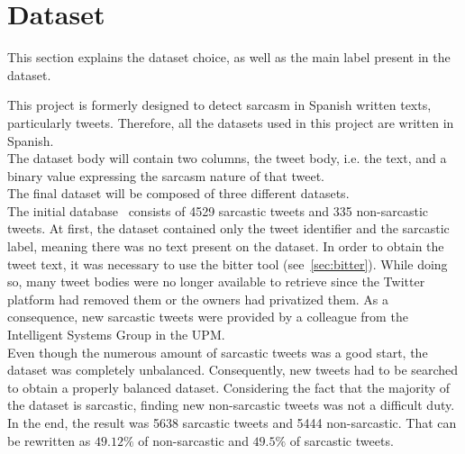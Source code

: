 \section{Dataset}
\label{sec:use-cases}
This section explains the dataset choice, as well as the main label present in the dataset.\par
This project is formerly designed to detect sarcasm in Spanish written texts, particularly tweets. Therefore, all the datasets used in this project are written in Spanish.\\
The dataset body will contain two columns, the tweet body, i.e. the text, and a binary value expressing the sarcasm nature of that tweet.\\
The final dataset will be composed of three different datasets.\\ 
The initial database~\cite{mexic} consists of 4529 sarcastic tweets and 335 non-sarcastic tweets. At first, the dataset contained only the tweet identifier and the sarcastic label, meaning there was no text present on the dataset. In order to obtain the tweet text, it was necessary to use the bitter tool (see~\cref{sec:bitter}). While doing so, many tweet bodies were no longer available to retrieve since the Twitter platform had removed them or the owners had privatized them. As a consequence, new sarcastic tweets were provided by a colleague from the Intelligent Systems Group in the UPM.\\
Even though the numerous amount of sarcastic tweets was a good start, the dataset was completely unbalanced. Consequently, new tweets had to be searched to obtain a properly balanced dataset. Considering the fact that the majority of the dataset is sarcastic, finding new non-sarcastic tweets was not a difficult duty.\\
In the end, the result was 5638 sarcastic tweets and 5444 non-sarcastic. That can be rewritten as $49.12\%$ of non-sarcastic and $49.5\%$ of sarcastic tweets.\par


